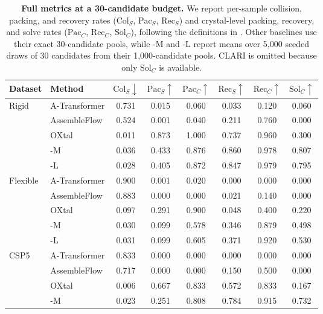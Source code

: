 \begin{table}[H]
\centering
\caption{\textbf{Full metrics at a 30-candidate budget.}
We report per-sample collision, packing, and recovery rates
($\mathrm{Col}_S$, $\mathrm{Pac}_S$, $\mathrm{Rec}_S$) and crystal-level
packing, recovery, and solve rates
($\mathrm{Pac}_C$, $\mathrm{Rec}_C$, $\mathrm{Sol}_C$), following the
definitions in \citet{jin2025oxtal}. Other baselines use their exact
30-candidate pools, while \model{}-M and \model{}-L report means over 5{,}000
seeded draws of 30 candidates from their 1{,}000-candidate pools. CLARI is
omitted because only $\mathrm{Sol}_C$ is available.}
\label{tab:combined_all_metrics}
\begin{tabular}{llcccccc}
\toprule
Dataset & Method & $\mathrm{Col}_S \downarrow$ & $\mathrm{Pac}_S \uparrow$ &
$\mathrm{Pac}_C \uparrow$ &
$\mathrm{Rec}_S \uparrow$ & $\mathrm{Rec}_C \uparrow$ &
$\mathrm{Sol}_C \uparrow$ \\
\midrule
Rigid & A-Transformer & 0.731 & 0.015 & 0.060 & 0.033 & 0.120 & 0.060 \\
 & AssembleFlow & 0.524 & 0.001 & 0.040 & 0.211 & 0.760 & 0.000 \\
 & OXtal & 0.011 & 0.873 & 1.000 & 0.737 & 0.960 & 0.300 \\
\rowcolor{mfTealFill}
 & \model{}-M & 0.036 & 0.433 & 0.876 & 0.860 & 0.978 & 0.807 \\
\rowcolor{mfTealFill}
 & \model{}-L & 0.028 & 0.405 & 0.872 & 0.847 & 0.979 & 0.795 \\
\midrule
Flexible & A-Transformer & 0.900 & 0.001 & 0.020 & 0.000 & 0.000 & 0.000 \\
 & AssembleFlow & 0.883 & 0.000 & 0.000 & 0.021 & 0.140 & 0.000 \\
 & OXtal & 0.097 & 0.291 & 0.900 & 0.048 & 0.400 & 0.220 \\
\rowcolor{mfTealFill}
 & \model{}-M & 0.030 & 0.099 & 0.578 & 0.346 & 0.879 & 0.498 \\
\rowcolor{mfTealFill}
 & \model{}-L & 0.031 & 0.099 & 0.605 & 0.371 & 0.920 & 0.530 \\
\midrule
CSP5 & A-Transformer & 0.833 & 0.000 & 0.000 & 0.000 & 0.000 & 0.000 \\
 & AssembleFlow & 0.717 & 0.000 & 0.000 & 0.150 & 0.500 & 0.000 \\
 & OXtal & 0.006 & 0.667 & 0.833 & 0.572 & 0.833 & 0.167 \\
\rowcolor{mfTealFill}
 & \model{}-M & 0.023 & 0.251 & 0.808 & 0.784 & 0.915 & 0.732 \\

\end{tabular}
\end{table}
